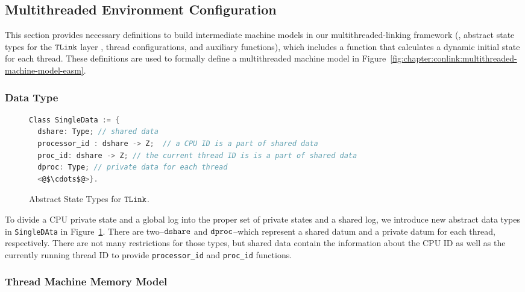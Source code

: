 
\subsection{Multithreaded Environment Configuration}
\label{chapter:linking:subsec:multithreaded-env-configuration}

This section provides  necessary definitions 
to build intermediate machine models in our multithreaded-linking framework
(\ie, abstract state types for the ${{\mathrm{\texttt{TLink}}}}$ layer , thread configurations, and auxiliary functions),
which includes a function that calculates a dynamic initial state for each thread.
These definitions are used to formally define a multithreaded machine model in Figure~\ref{fig:chapter:conlink:multithreaded-machine-model-easm}.
%

\subsubsection{Data Type} 

\begin{figure}
\begin{lstlisting}[language=C, morekeywords={Class}]
Class SingleData := {
  dshare: Type; // shared data    
  processor_id : dshare -> Z;  // a CPU ID is a part of shared data
  proc_id: dshare -> Z; // the current thread ID is is a part of shared data
  dproc: Type; // private data for each thread
  <@$\cdots$@>}.
\end{lstlisting} 
\caption{Abstract State Types for ${{\mathrm{\texttt{TLink}}}}$.}
\label{fig:chapter:conlink:abs-state-types-for-tlink}
\end{figure}

To divide a CPU private state and a global log into the proper set of private states and a shared log, we introduce new abstract data types in \lstinline$SingleDAta$ in Figure~\ref{fig:chapter:conlink:abs-state-types-for-tlink}. 
There are two--${\mathrm{\texttt{dshare}}}$ and ${\mathrm{\texttt{dproc}}}$--which represent a shared datum and a private datum for each thread, respectively. 
There are not many restrictions for those types,
but shared data contain the information about the 
CPU ID as well as the currently running thread ID to provide 
\lstinline$processor_id$ and \lstinline$proc_id$ functions. 


\subsubsection{Thread Machine Memory Model}

